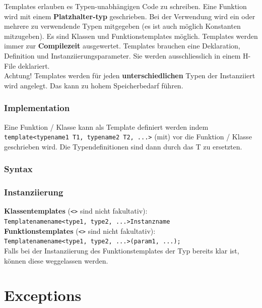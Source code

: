 Templates erlauben es Typen-unabhängigen Code zu schreiben. 
Eine Funktion wird mit einem \textbf{Platzhalter-typ} geschrieben. 
Bei der Verwendung wird ein oder mehrere zu verwendende Typen mitgegeben (es ist auch möglich Konstanten mitzugeben). 
Es sind Klassen und Funktionstemplates möglich. 
Templates werden immer zur \textbf{Compilezeit} ausgewertet. 
Templates brauchen eine Deklaration, Definition und Instanziierungsparameter. 
Sie werden ausschliesslich in einem H-File deklariert.\\
Achtung! Templates werden für jeden \textbf{unterschiedlichen} Typen der Instanziiert wird angelegt. 
Das kann zu hohem Speicherbedarf führen.

\subsubsection{Implementation}

Eine Funktion / Klasse kann als Template definiert werden indem \verb|template<typename1 T1, typename2 T2, ...>| (mit\say{$<>$}) vor die Funktion / Klasse geschrieben wird. 
Die Typendefinitionen sind dann durch das T zu ersetzten. 



\subsubsection{Syntax}



\subsubsection{Instanziierung}

\textbf{Klassentemplates} (\verb|<>| sind nicht fakultativ):\\
\verb|Templatenamename<type1, type2, ...>Instanzname|\\

\textbf{Funktionstemplates} (\verb|<>| sind nicht fakultativ):\\
\verb|Templatenamename<type1, type2, ...>(param1, ...);|\\

Falls bei der Instanziierung des Funktionstemplates der Typ bereits klar ist, können diese weggelassen werden.\\
\nextcol

\section{Exceptions}

